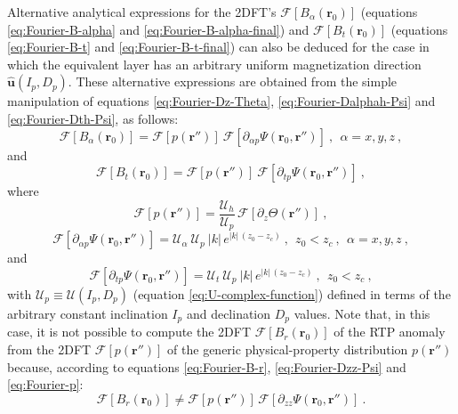 Alternative analytical expressions for the 2DFT's 
$\mathcal{F}\left[ B_{\alpha}(\mathbf{r}_{0}) \right]$ 
(equations \ref{eq:Fourier-B-alpha} and \ref{eq:Fourier-B-alpha-final})
and
$\mathcal{F}\left[ B_{t}(\mathbf{r}_{0}) \right]$ 
(equations \ref{eq:Fourier-B-t} and \ref{eq:Fourier-B-t-final}) 
can also be deduced for the case in which the
equivalent layer has an arbitrary uniform magnetization direction 
$\hat{\mathbf{u}}(I_{p}, D_{p})$. These alternative expressions are obtained from the
simple manipulation of equations \ref{eq:Fourier-Dz-Theta},
\ref{eq:Fourier-Dalphah-Psi} and \ref{eq:Fourier-Dth-Psi}, as follows:
\begin{equation}
\mathcal{F}\left[ B_{\alpha}(\mathbf{r}_{0}) \right] = 
\mathcal{F}\left[ p(\mathbf{r}'') \right] \: 
\mathcal{F}\left[ \partial_{\alpha p} \Psi(\mathbf{r}_{0}, \mathbf{r}'') \right] \: ,
\:\: \alpha = x, y, z \: ,
\label{eq:Fourier-B-alpha-arbitrary}
\end{equation}
and
\begin{equation}
\mathcal{F}\left[ B_{t}(\mathbf{r}_{0}) \right] = 
\mathcal{F}\left[ p(\mathbf{r}'') \right] \: 
\mathcal{F}\left[ \partial_{tp} \Psi(\mathbf{r}_{0}, \mathbf{r}'') \right] \: ,
\label{eq:Fourier-B-t-arbitrary}
\end{equation}
where
\begin{equation}
\mathcal{F}\left[ p(\mathbf{r}'') \right] 
= \frac{\mathcal{U}_{h}}{\mathcal{U}_{p}} \, 
\mathcal{F}\left[ \partial_{z} \Theta(\mathbf{r}'') \right] \: ,
\label{eq:Fourier-p}
\end{equation}
\begin{equation}
\mathcal{F}\left[ \partial_{\alpha p} \Psi(\mathbf{r}_{0}, \mathbf{r}'') \right] = 
\mathcal{U}_{\alpha} \: \mathcal{U}_{p} \: |k| \, e^{|k| \, (z_{0} - z_{c})}
\: , \:\: z_{0} < z_{c} \: , \:\: \alpha = x, y, z \: ,
\label{eq:Fourier-Dalphap-Psi}
\end{equation}
and
\begin{equation}
\mathcal{F}\left[ \partial_{tp} \Psi(\mathbf{r}_{0}, \mathbf{r}'') \right] = 
\mathcal{U}_{t} \: \mathcal{U}_{p} \: |k| \, e^{|k| \, (z_{0} - z_{c})}
\: , \:\: z_{0} < z_{c} \: ,
\label{eq:Fourier-Dtp-Psi}
\end{equation}
with $\mathcal{U}_{p} \equiv \mathcal{U}(I_{p}, D_{p})$ (equation 
\ref{eq:U-complex-function}) defined in terms of the arbitrary constant 
inclination $I_{p}$ and declination $D_{p}$ values.
Note that, in this case, it is not possible to compute the 2DFT 
$\mathcal{F}\left[ B_{r}(\mathbf{r}_{0}) \right]$ of the RTP anomaly from the
2DFT $\mathcal{F}\left[ p(\mathbf{r}'') \right]$ of the generic physical-property 
distribution $p(\mathbf{r}'')$ because, according to equations \ref{eq:Fourier-B-r}, 
\ref{eq:Fourier-Dzz-Psi} and \ref{eq:Fourier-p}:
\begin{equation}
\mathcal{F}\left[ B_{r}(\mathbf{r}_{0}) \right]
\ne \mathcal{F}\left[ p(\mathbf{r}'') \right] \, 
\mathcal{F}\left[ \partial_{zz} \Psi(\mathbf{r}_{0}, \mathbf{r}'') \right] \: .
\label{eq:Fourier-B-r-wrong}
\end{equation}

